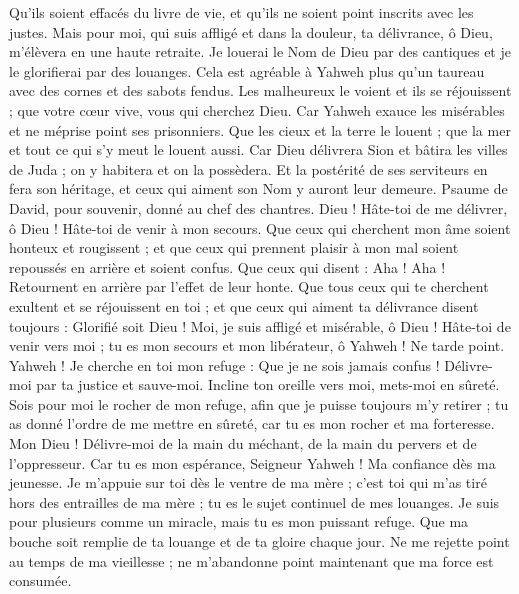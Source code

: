 \begin{multicols}{2}
Qu'ils soient effacés du livre de vie, et qu'ils ne soient point inscrits avec les justes.
Mais pour moi, qui suis affligé et dans la douleur, ta délivrance, ô Dieu, m’élèvera en une haute retraite.
Je louerai le Nom de Dieu par des cantiques et je le glorifierai par des louanges.
Cela est agréable à Yahweh plus qu'un taureau avec des cornes et des sabots fendus.
Les malheureux le voient et ils se réjouissent ; que votre cœur vive, vous qui cherchez Dieu.
Car Yahweh exauce les misérables et ne méprise point ses prisonniers.
Que les cieux et la terre le louent ; que la mer et tout ce qui s’y meut le louent aussi.
Car Dieu délivrera Sion et bâtira les villes de Juda ; on y habitera et on la possèdera.
Et la postérité de ses serviteurs en fera son héritage, et ceux qui aiment son Nom y auront leur demeure.
\VerseOne{}Psaume de David, pour souvenir, donné au chef des chantres.
Dieu ! Hâte-toi de me délivrer, ô Dieu ! Hâte-toi de venir à mon secours.
Que ceux qui cherchent mon âme soient honteux et rougissent ; et que ceux qui prennent plaisir à mon mal soient repoussés en arrière et soient confus.
Que ceux qui disent : Aha ! Aha ! Retournent en arrière par l’effet de leur honte.
Que tous ceux qui te cherchent exultent et se réjouissent en toi ; et que ceux qui aiment ta délivrance disent toujours : Glorifié soit Dieu !
Moi, je suis affligé et misérable, ô Dieu ! Hâte-toi de venir vers moi ; tu es mon secours et mon libérateur, ô Yahweh ! Ne tarde point.
\VerseOne{}Yahweh ! Je cherche en toi mon refuge : Que je ne sois jamais confus !
Délivre-moi par ta justice et sauve-moi. Incline ton oreille vers moi, mets-moi en sûreté.
Sois pour moi le rocher de mon refuge, afin que je puisse toujours m’y retirer ; tu as donné l’ordre de me mettre en sûreté, car tu es mon rocher et ma forteresse.
Mon Dieu ! Délivre-moi de la main du méchant, de la main du pervers et de l'oppresseur.
Car tu es mon espérance, Seigneur Yahweh ! Ma confiance dès ma jeunesse.
Je m’appuie sur toi dès le ventre de ma mère ; c'est toi qui m'as tiré hors des entrailles de ma mère ; tu es le sujet continuel de mes louanges.
Je suis pour plusieurs comme un miracle, mais tu es mon puissant refuge.
Que ma bouche soit remplie de ta louange et de ta gloire chaque jour.
Ne me rejette point au temps de ma vieillesse ; ne m'abandonne point maintenant que ma force est consumée.

\end{multicols}
